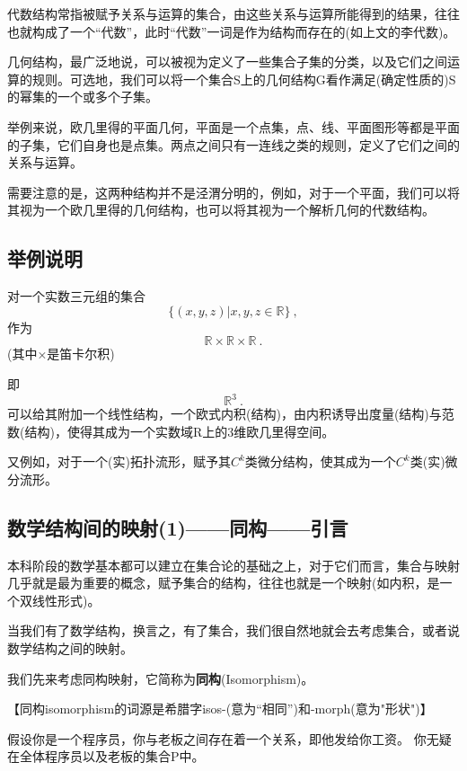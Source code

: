代数结构常指被赋予关系与运算的集合，由这些关系与运算所能得到的结果，往往也就构成了一个“代数”，此时“代数”一词是作为结构而存在的(如上文的李代数)。

几何结构，最广泛地说，可以被视为定义了一些集合子集的分类，以及它们之间运算的规则。可选地，我们可以将一个集合S上的几何结构G看作满足(确定性质的)S的幂集的一个或多个子集。 

举例来说，欧几里得的平面几何，平面是一个点集，点、线、平面图形等都是平面的子集，它们自身也是点集。两点之间只有一连线之类的规则，定义了它们之间的关系与运算。

需要注意的是，这两种结构并不是泾渭分明的，例如，对于一个平面，我们可以将其视为一个欧几里得的几何结构，也可以将其视为一个解析几何的代数结构。

\subsection{举例说明}
对一个实数三元组的集合
\begin{equation}
 \{(x,y,z)|x,y,z \in {\mathbb R} \}~,
\end{equation}
作为
\begin{equation}
 {\mathbb R} \times {\mathbb R} \times {\mathbb R}~.
\end{equation}
(其中×是笛卡尔积)

即\begin{equation}
 {\mathbb R}^3~.
\end{equation}
可以给其附加一个线性结构，一个欧式内积(结构)，由内积诱导出度量(结构)与范数(结构)，使得其成为一个实数域R上的3维欧几里得空间。 

又例如，对于一个(实)拓扑流形，赋予其$C^k$类微分结构，使其成为一个$C^k$类(实)微分流形。

\subsection{数学结构间的映射(1)——同构——引言}
本科阶段的数学基本都可以建立在集合论的基础之上，对于它们而言，集合与映射几乎就是最为重要的概念，赋予集合的结构，往往也就是一个映射(如内积，是一个双线性形式)。

当我们有了数学结构，换言之，有了集合，我们很自然地就会去考虑集合，或者说数学结构之间的映射。

我们先来考虑同构映射，它简称为\textbf{同构}(Isomorphism)。

【同构isomorphism的词源是希腊字isos-(意为“相同”)和-morph(意为"形状")】

假设你是一个程序员，你与老板之间存在着一个关系，即他发给你工资。
你无疑在全体程序员以及老板的集合P中。

